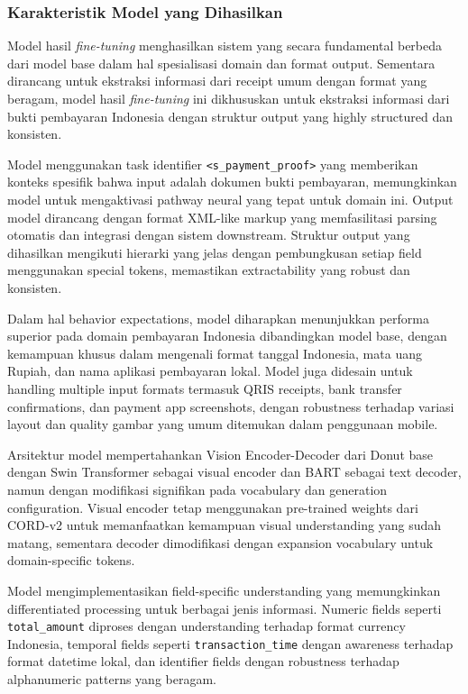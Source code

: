 \subsubsection{Karakteristik Model yang Dihasilkan}
\label{subsubsec:karakteristik-model}

Model hasil \emph{fine-tuning} menghasilkan sistem yang secara fundamental berbeda dari model base \donutcord{} dalam hal spesialisasi domain dan format output. Sementara \donutcord{} dirancang untuk ekstraksi informasi dari receipt umum dengan format yang beragam, model hasil \emph{fine-tuning} ini dikhususkan untuk ekstraksi informasi dari bukti pembayaran Indonesia dengan struktur output yang highly structured dan konsisten.

Model menggunakan task identifier \texttt{<s\_payment\_proof>} yang memberikan konteks spesifik bahwa input adalah dokumen bukti pembayaran, memungkinkan model untuk mengaktivasi pathway neural yang tepat untuk domain ini. Output model dirancang dengan format XML-like markup yang memfasilitasi parsing otomatis dan integrasi dengan sistem downstream. Struktur output yang dihasilkan mengikuti hierarki yang jelas dengan pembungkusan setiap field menggunakan special tokens, memastikan extractability yang robust dan konsisten.

Dalam hal behavior expectations, model diharapkan menunjukkan performa superior pada domain pembayaran Indonesia dibandingkan model base, dengan kemampuan khusus dalam mengenali format tanggal Indonesia, mata uang Rupiah, dan nama aplikasi pembayaran lokal. Model juga didesain untuk handling multiple input formats termasuk QRIS receipts, bank transfer confirmations, dan payment app screenshots, dengan robustness terhadap variasi layout dan quality gambar yang umum ditemukan dalam penggunaan mobile.

Arsitektur model mempertahankan Vision Encoder-Decoder dari Donut base dengan Swin Transformer sebagai visual encoder dan BART sebagai text decoder, namun dengan modifikasi signifikan pada vocabulary dan generation configuration. Visual encoder tetap menggunakan pre-trained weights dari CORD-v2 untuk memanfaatkan kemampuan visual understanding yang sudah matang, sementara decoder dimodifikasi dengan expansion vocabulary untuk domain-specific tokens.

Model mengimplementasikan field-specific understanding yang memungkinkan differentiated processing untuk berbagai jenis informasi. Numeric fields seperti \texttt{total\_amount} diproses dengan understanding terhadap format currency Indonesia, temporal fields seperti \texttt{transaction\_time} dengan awareness terhadap format datetime lokal, dan identifier fields dengan robustness terhadap alphanumeric patterns yang beragam.

